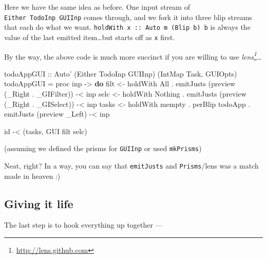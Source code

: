 \documentclass[]{article}
\newenvironment{Shaded}{}{}
\newcommand{\KeywordTok}[1]{\textcolor[rgb]{0.00,0.44,0.13}{\textbf{{#1}}}}
\newcommand{\DataTypeTok}[1]{\textcolor[rgb]{0.56,0.13,0.00}{{#1}}}
\newcommand{\OtherTok}[1]{\textcolor[rgb]{0.00,0.44,0.13}{{#1}}}
\newcommand{\FunctionTok}[1]{\textcolor[rgb]{0.02,0.16,0.49}{{#1}}}
\newcommand{\NormalTok}[1]{{#1}}
\renewcommand{\href}[2]{#2\footnote{\url{#1}}}
\begin{document}
Here we have the same idea as before. One input stream of
\texttt{Either\ TodoInp\ GUIInp} comes through, and we fork it into
three blip streams that each do what we want.
\texttt{holdWith\ x\ ::\ Auto\ m\ (Blip\ b)\ b} is always the value of
the last emitted item\ldots{}but starts off as \texttt{x} first.

By the way, the above code is much more succinct if you are willing to
use \emph{\href{http://lens.github.com}{lens}}\ldots{}

\begin{Shaded}
\begin{Highlighting}[]
\OtherTok{todoAppGUI ::} \DataTypeTok{Auto'} \NormalTok{(}\DataTypeTok{Either} \DataTypeTok{TodoInp} \DataTypeTok{GUIInp}\NormalTok{) (}\DataTypeTok{IntMap} \DataTypeTok{Task}\NormalTok{, }\DataTypeTok{GUIOpts}\NormalTok{)}
\NormalTok{todoAppGUI }\FunctionTok{=} \NormalTok{proc inp }\OtherTok{->} \KeywordTok{do}
    \NormalTok{filt  }\OtherTok{<-} \NormalTok{holdWith }\DataTypeTok{All}
           \FunctionTok{.} \NormalTok{emitJusts (preview (_}\DataTypeTok{Right} \FunctionTok{.} \NormalTok{_}\DataTypeTok{GIFilter}\NormalTok{)) }\FunctionTok{-<} \NormalTok{inp}
    \NormalTok{selc  }\OtherTok{<-} \NormalTok{holdWith }\DataTypeTok{Nothing}
           \FunctionTok{.} \NormalTok{emitJusts (preview (_}\DataTypeTok{Right} \FunctionTok{.} \NormalTok{_}\DataTypeTok{GISelect}\NormalTok{)) }\FunctionTok{-<} \NormalTok{inp}
    \NormalTok{tasks }\OtherTok{<-} \NormalTok{holdWith mempty }\FunctionTok{.} \NormalTok{perBlip todoApp}
           \FunctionTok{.} \NormalTok{emitJusts (preview _}\DataTypeTok{Left}\NormalTok{)                }\FunctionTok{-<} \NormalTok{inp}

    \NormalTok{id }\FunctionTok{-<} \NormalTok{(tasks, }\DataTypeTok{GUI} \NormalTok{filt selc)}
\end{Highlighting}
\end{Shaded}

(assuming we defined the prisms for \texttt{GUIInp} or used
\texttt{\textquotesingle{}\textquotesingle{}mkPrisms})

Neat, right? In a way, you can say that \texttt{emitJusts} and
\texttt{Prisms}/lens was a match made in heaven :)

\subsection{Giving it life}\label{giving-it-life}

The last step is to hook everything up together ---
\end{document}

